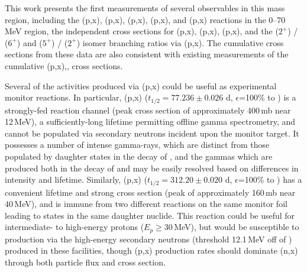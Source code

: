 This work presents the first measurements of several observables in 
this mass region, including the (p,x), (p,x), (p,x),  (p,x), and (p,x) reactions in the 0--70\,MeV region, 
the independent cross sections for       (p,x), (p,x), (p,x), and the  ($2^+$) /   ($6^+$) and  ($5^+$) /   ($2^+$)  isomer branching ratios via (p,x).  
The cumulative cross sections from these data are also consistent with existing measurements of the cumulative (p,x),, cross sections.



Several of the activities produced via (p,x)  could be useful as experimental monitor reactions. 
In particular, (p,x) ($t_{1/2}=77.236\pm0.026$ d, $\epsilon$=100\% to  \cite{Junde2011})  is a strongly-fed reaction channel (peak cross section of approximately 400\,mb near 12\,MeV), a sufficiently-long lifetime permitting offline gamma spectrometry,  and  cannot be populated via secondary neutrons incident upon the monitor target. 
It possesses a number of intense gamma-rays, which are distinct from those populated by daughter states in the decay of  , and the gammas which are produced both in the decay of   and   may be easily resolved based on differences in intensity and lifetime. 
Similarly,  (p,x)  ($t_{1/2}=312.20\pm0.020$ d, $\epsilon$=100\% to  \cite{Dong2014}) has a convenient lifetime and strong cross section (peak of approximately 160\,mb near 40\,MeV), and is immune from two different reactions on the same monitor foil leading to states in the same daughter nuclide.
This reaction could be useful for intermediate- to high-energy protons ($E_p \geq$30\,MeV), but would be susceptible to production via the high-energy secondary neutrons  (threshold 12.1\,MeV off of ) produced in these facilities, though (p,x) production rates should dominate (n,x) through both particle flux and cross section. 


